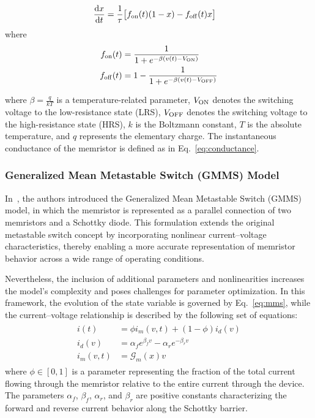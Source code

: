 \documentclass[lettersize,journal]{IEEEtran}
\newcommand{\G}{\mathcal{G}}
\newcommand{\von}{V_{\rm ON}}
\newcommand{\voff}{V_{\rm OFF}}
\newcommand{\ua}{v}
\newcommand{\dert}[1]{\frac{{\rm d} {#1}}{{\rm d} t} }
\begin{document}
\begin{align}
  \label{eq:mms}
  \dert{x} & = \frac{1}{\tau} \big[ f_{\rm on}(t) (1-x) - f_{\rm off}(t) x \big]
\end{align}
where
\begin{align}
  f_{\rm on}(t)  & = \frac{1}{1+e^{-\beta (\ua(t)-\von)}} \label{eq:mms5b}      \\
  f_{\rm off}(t) & = 1 - \frac{1}{1+e^{-\beta (\ua(t)-\voff)}} \label{eq:mms5c}
\end{align}

where \(\beta= \frac{q}{kT}\) is a temperature-related parameter, \(\von\) denotes the switching voltage to the low-resistance state (LRS), \(\voff\) denotes the switching voltage to the high-resistance state (HRS), \(k\) is the Boltzmann constant, \(T\) is the absolute temperature, and \(q\) represents the elementary charge. The instantaneous conductance of the memristor is defined as in Eq.~\eqref{eq:conductance}.

\subsubsection{Generalized Mean Metastable Switch (GMMS) Model}
In~\cite{Molter2016}, the authors introduced the Generalized Mean Metastable Switch (GMMS) model, in which the memristor is represented as a parallel connection of two memristors and a Schottky diode. This formulation extends the original metastable switch concept by incorporating nonlinear current--voltage characteristics, thereby enabling a more accurate representation of memristor behavior across a wide range of operating conditions.

Nevertheless, the inclusion of additional parameters and nonlinearities increases the model's complexity and poses challenges for parameter optimization. In this framework, the evolution of the state variable is governed by Eq.~\eqref{eq:mms}, while the current--voltage relationship is described by the following set of equations:
\begin{align}
  \begin{split}
    i(t)      & = \phi i_m(v, t) + (1-\phi) i_d(v)                 \\
    i_d(v)    & = \alpha_f e^{\beta_f v} - \alpha_r e^{-\beta_r v} \\
    i_m(v, t) & = \G_m(x) v
  \end{split}
  \label{eq:gmms}
\end{align}
where \(\phi \in [0,1]\) is a parameter representing the fraction of the total current flowing through the memristor relative to the entire current through the device. The parameters \(\alpha_f\), \(\beta_f\), \(\alpha_r\), and \(\beta_r\) are positive constants characterizing the forward and reverse current behavior along the Schottky barrier.
\end{document}

